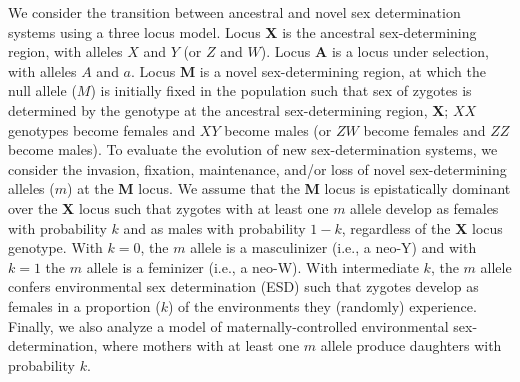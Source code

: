 \documentclass[12pt]{article}
\begin{document}
We consider the transition between ancestral and novel sex determination systems using a three locus model. 
Locus \textbf{X} is the ancestral sex-determining region, with alleles $X$ and $Y$ (or $Z$ and $W$).
Locus \textbf{A} is a locus under selection, with alleles $A$ and $a$.
Locus \textbf{M} is a novel sex-determining region, at which the null allele ($M$) is initially fixed in the population such that sex of zygotes is determined by the genotype at the ancestral sex-determining region, \textbf{X}; $XX$ genotypes become females and $XY$ become males (or $ZW$ become females and $ZZ$ become males). 
To evaluate the evolution of new sex-determination systems, we consider the invasion, fixation, maintenance, and/or loss of novel sex-determining alleles ($m$) at the \textbf{M} locus. 
We assume that the \textbf{M} locus is epistatically dominant over the \textbf{X} locus such that zygotes with at least one $m$ allele develop as females with probability $k$ and as males with probability $1-k$, regardless of the \textbf{X} locus genotype.
With $k=0$, the $m$ allele is a masculinizer (i.e., a neo-Y) and with $k=1$ the $m$ allele is a feminizer (i.e., a neo-W).
With intermediate $k$, the $m$ allele confers environmental sex determination (ESD) such that zygotes develop as females in a proportion ($k$) of the environments they (randomly) experience. 
Finally, we also analyze a model of maternally-controlled environmental sex-determination, where mothers with at least one $m$ allele produce daughters with probability $k$. 
\end{document}
